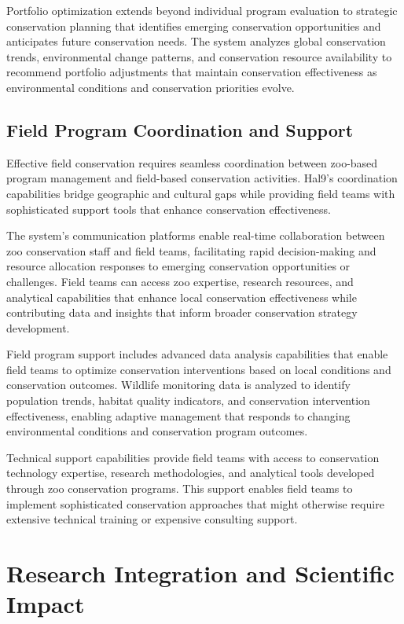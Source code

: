 \documentclass[
  Letterpaper,
]{scrbook}
\begin{document}
Portfolio optimization extends beyond individual program evaluation to
strategic conservation planning that identifies emerging conservation
opportunities and anticipates future conservation needs. The system
analyzes global conservation trends, environmental change patterns, and
conservation resource availability to recommend portfolio adjustments
that maintain conservation effectiveness as environmental conditions and
conservation priorities evolve.

\subsection{Field Program Coordination and
Support}\label{field-program-coordination-and-support}

Effective field conservation requires seamless coordination between
zoo-based program management and field-based conservation activities.
Hal9's coordination capabilities bridge geographic and cultural gaps
while providing field teams with sophisticated support tools that
enhance conservation effectiveness.

The system's communication platforms enable real-time collaboration
between zoo conservation staff and field teams, facilitating rapid
decision-making and resource allocation responses to emerging
conservation opportunities or challenges. Field teams can access zoo
expertise, research resources, and analytical capabilities that enhance
local conservation effectiveness while contributing data and insights
that inform broader conservation strategy development.

Field program support includes advanced data analysis capabilities that
enable field teams to optimize conservation interventions based on local
conditions and conservation outcomes. Wildlife monitoring data is
analyzed to identify population trends, habitat quality indicators, and
conservation intervention effectiveness, enabling adaptive management
that responds to changing environmental conditions and conservation
program outcomes.

Technical support capabilities provide field teams with access to
conservation technology expertise, research methodologies, and
analytical tools developed through zoo conservation programs. This
support enables field teams to implement sophisticated conservation
approaches that might otherwise require extensive technical training or
expensive consulting support.

\section{Research Integration and Scientific
Impact}\label{research-integration-and-scientific-impact}
\end{document}

